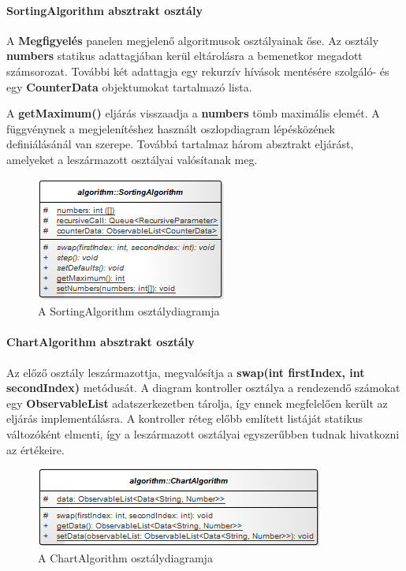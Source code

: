 \documentclass{elteikthesis}
\begin{document}
\paragraph{SortingAlgorithm absztrakt osztály}
A \textbf{Megfigyelés} panelen megjelenő algoritmusok osztályainak őse. Az osztály \textbf{numbers} statikus adattagjában kerül eltárolásra a bemenetkor megadott számsorozat. További két adattagja egy rekurzív hívások mentésére szolgáló- és egy \textbf{CounterData} objektumokat tartalmazó lista.\par
A \textbf{getMaximum()} eljárás visszaadja a \textbf{numbers} tömb maximális elemét. A függvénynek a megjelenítéshez használt oszlopdiagram lépésközének definiálásánál van szerepe. Továbbá tartalmaz három absztrakt eljárást, amelyeket a leszármazott osztályai valósítanak meg.
\begin{figure}[H]
	\centering
	\includegraphics{pics/class/SortingAlgorithm.png}
	\caption{A SortingAlgorithm osztálydiagramja}
\end{figure}
\paragraph{ChartAlgorithm absztrakt osztály}
Az előző osztály leszármazottja, megvalósítja a \textbf{swap(int firstIndex, int secondIndex)} metódusát. A diagram kontroller osztálya a rendezendő számokat egy \textbf{ObservableList} adatszerkezetben tárolja, így ennek megfelelően került az eljárás implementálásra. A kontroller réteg előbb említett listáját statikus változóként elmenti, így a leszármazott osztályai egyszerűbben tudnak hivatkozni az értékeire.
\begin{figure}[H]
	\centering
	\includegraphics{pics/class/ChartAlgorithm.png}
	\caption{A ChartAlgorithm osztálydiagramja}
\end{figure}
\end{document}
